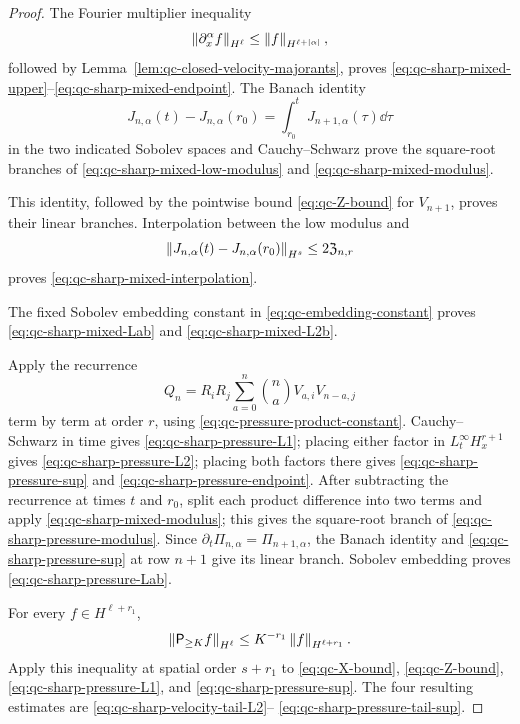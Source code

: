 {\begin{proof}
The Fourier multiplier inequality
\[
 \left\lVert \partial_x^\alpha f\right\rVert_{H^\ell}
 \le\left\lVert f\right\rVert_{H^{\ell+|\alpha|}},
\]
followed by Lemma~\ref{lem:qc-closed-velocity-majorants}, proves
\eqref{eq:qc-sharp-mixed-upper}--\eqref{eq:qc-sharp-mixed-endpoint}.
The Banach identity
\[
 J_{n,\alpha}(t)-J_{n,\alpha}(r_0)
 =\int_{r_0}^tJ_{n+1,\alpha}(\tau)\dd\tau
\]
in the two indicated Sobolev spaces and Cauchy--Schwarz prove the
square-root branches of \eqref{eq:qc-sharp-mixed-low-modulus} and
\eqref{eq:qc-sharp-mixed-modulus}.
\begin{samepage}
This identity, followed by the
pointwise bound \eqref{eq:qc-Z-bound} for \(V_{n+1}\), proves their linear
branches.  Interpolation between the low modulus
and
\[
 \left\lVert J_{n,\alpha}(t)-J_{n,\alpha}(r_0)\right\rVert_{H^s}
 \le2\mathfrak Z_{n,r}
\]
proves \eqref{eq:qc-sharp-mixed-interpolation}.
\end{samepage}
The fixed Sobolev embedding constant in \eqref{eq:qc-embedding-constant} proves
\eqref{eq:qc-sharp-mixed-Lab} and \eqref{eq:qc-sharp-mixed-L2b}.

Apply the recurrence
\[
 Q_n=R_iR_j\sum_{a=0}^{n}\binom naV_{a,i}V_{n-a,j}
\]
term by term at order \(r\), using
\eqref{eq:qc-pressure-product-constant}.  Cauchy--Schwarz in time gives
\eqref{eq:qc-sharp-pressure-L1}; placing either factor in
\(L_t^\infty H_x^{r+1}\) gives
\eqref{eq:qc-sharp-pressure-L2}; placing both factors there gives
\eqref{eq:qc-sharp-pressure-sup} and
\eqref{eq:qc-sharp-pressure-endpoint}.  After subtracting the recurrence at
times \(t\) and \(r_0\), split each product difference into two terms and
apply \eqref{eq:qc-sharp-mixed-modulus}; this gives the square-root branch
of \eqref{eq:qc-sharp-pressure-modulus}.  Since
\(\partial_t\Pi_{n,\alpha}=\Pi_{n+1,\alpha}\), the Banach identity and
\eqref{eq:qc-sharp-pressure-sup} at row \(n+1\) give its linear branch.
Sobolev embedding proves
\eqref{eq:qc-sharp-pressure-Lab}.

For every \(f\in H^{\ell+r_1}\),
\[
 \left\lVert \mathsf P_{\ge K}f\right\rVert_{H^\ell}
 \le K^{-r_1}\left\lVert f\right\rVert_{H^{\ell+r_1}}.
\]
Apply this inequality at spatial order \(s+r_1\) to
\eqref{eq:qc-X-bound}, \eqref{eq:qc-Z-bound},
\eqref{eq:qc-sharp-pressure-L1}, and
\eqref{eq:qc-sharp-pressure-sup}.  The four resulting estimates are
\eqref{eq:qc-sharp-velocity-tail-L2}--%
\eqref{eq:qc-sharp-pressure-tail-sup}.


\end{proof}}
